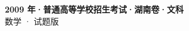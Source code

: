 \documentclass[zihao=-4, a4paper]{ctexart}
\begin{document}
\begin{center}
  {\Large\bfseries 2009 年·普通高等学校招生考试·湖南卷·文科}\\[4pt]
  {\large 数学 · 试题版}
\end{center}
\medskip
{}

\end{document}
